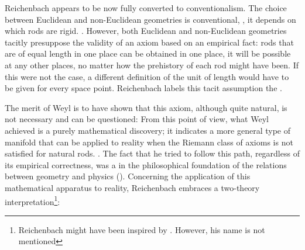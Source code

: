 \documentclass[draft]{article}
\begin{document}


Reichenbach appears to be now fully converted to conventionalism. The choice between Euclidean and non-Euclidean geometries is conventional, \ie, it depends on which rods are rigid. \citep[366]{Reichenbach1922}. However, both Euclidean and non-Euclidean geometries tacitly presuppose the validity of an axiom based on an empirical fact: rods that are of equal length in one place can be obtained in one place, it will be possible at any other places, no matter how the prehistory of each rod might have been. If this were not the case, a different definition of the unit of length would have to be given for every space point. Reichenbach labels this tacit assumption the  \citep[366]{Reichenbach1922}. 

The merit of Weyl is to have shown that this axiom, although quite natural, is not necessary and can be questioned: From this point of view, what Weyl achieved is a purely mathematical discovery; it indicates a more general type of manifold that can be applied to reality when the Riemann class of axioms is not satisfied for natural rods.  \citep[365]{Reichenbach1922a}. The fact that he tried to follow this path, regardless of its empirical correctness, was a  in the philosophical foundation of the relations between geometry and physics (\citealp[367f.]{Reichenbach1921}). Concerning the application of this mathematical apparatus to reality, Reichenbach embraces a two-theory interpretation\footnote{Reichenbach might have been inspired by \citet{Pauli1921}. However, his name is not mentioned}:
\end{document}
